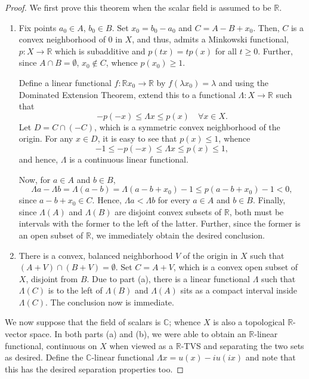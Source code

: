 \documentclass[11pt]{article}
\theoremstyle{thmstyle}
\theoremstyle{defstyle}
\newcommand{\R}{\mathbb{R}}
\newcommand{\bbC}{\mathbb{C}}
\renewcommand{\le}{\leqslant}
\renewcommand{\ge}{\geqslant}
\begin{document}
\begin{proof}
    We first prove this theorem when the scalar field is assumed to be $\R$.
\begin{enumerate}[label=(\alph*)]
    \item Fix points $a_0\in A$, $b_0\in B$. Set $x_0 = b_0 - a_0$ and $C = A - B + x_0$. Then, $C$ is a convex neighborhood of $0$ in $X$, and thus, admits a Minkowski functional, $p: X\to\R$ which is subadditive and $p(tx) = tp(x)$ for all $t\ge 0$.
    Further, since $A\cap B = \emptyset$, $x_0\notin C$, whence $p(x_0)\ge 1$.

    Define a linear functional $f: \R x_0\to\R$ by $f(\lambda x_0) = \lambda$ and using the Dominated Extension Theorem, extend this to a functional $\Lambda: X\to\R$ such that 
    \begin{equation*}
        -p(-x)\le \Lambda x\le p(x)\quad\forall x\in X.
    \end{equation*}
    Let $D = C\cap (-C)$, which is a symmetric convex neighborhood of the origin. For any $x\in D$, it is easy to see that $p(x)\le 1$, whence 
    \begin{equation*}
        -1\le -p(-x)\le\Lambda x\le p(x)\le 1,
    \end{equation*}
    and hence, $\Lambda$ is a continuous linear functional.

    Now, for $a\in A$ and $b\in B$, 
    \begin{equation*}
        \Lambda a - \Lambda b = \Lambda(a - b) = \Lambda(a - b + x_0) - 1 \le p(a - b + x_0) - 1 < 0,
    \end{equation*}
    since $a - b + x_0\in C$. Hence, $\Lambda a < \Lambda b$ for every $a\in A$ and $b\in B$. Finally, since $\Lambda(A)$ and $\Lambda(B)$ are disjoint convex subsets of $\R$, both must be intervals with the former to the left of the latter. Further, since the former is an open subset of $\R$, we immediately obtain the desired conclusion.

    \item There is a convex, balanced neighborhood $V$ of the origin in $X$ such that $(A + V)\cap (B + V) = \emptyset$. Set $C = A + V$, which is a convex open subset of $X$, disjoint from $B$. Due to part (a), there is a linear functional $\Lambda$ such that $\Lambda(C)$ is to the left of $\Lambda(B)$ and $\Lambda(A)$ sits as a compact interval inside $\Lambda(C)$. The conclusion now is immediate.
\end{enumerate}

We now suppose that the field of scalars is $\bbC$; whence $X$ is also a topological $\R$-vector space. In both parts (a) and (b), we were able to obtain an $\R$-linear functional, continuous on $X$ when viewed as a $\R$-TVS and separating the two sets as desired. Define the $\bbC$-linear functional $\Lambda x = u(x) - iu(ix)$ and note that this has the desired separation properties too.
\end{proof}
\end{document}
